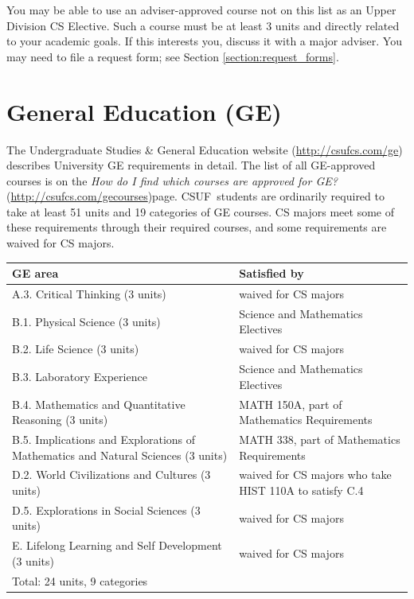 \documentclass{book}
\newcommand{\CampusName}{CSUF}
\newcommand{\shrunkurl}[1]{\url{http://csufcs.com/#1}}
\begin{document}
You may be able to use an adviser-approved course not on this list as an Upper Division CS Elective. Such a course must be at least 3 units and directly related to your academic goals. If this interests you, discuss it with a major adviser. You may need to file a request form; see Section \ref{section:request_forms}.

\section{General Education (GE)}

\newcommand{\gecourselist}{\emph{How do I find which courses are approved for GE?} (\shrunkurl{gecourses})}

The Undergraduate Studies \& General Education website (\shrunkurl{ge}) describes University GE requirements in detail. The list of all GE-approved courses is on the \gecourselist page. \CampusName~students are ordinarily required to take at least 51 units and 19 categories of GE courses. CS majors meet some of these requirements through their required courses, and some requirements are waived for CS majors.

\begin{center}
\begin{tabular}{| p{3in} | p{3in} |} \hline
  \textbf{GE area} & \textbf{Satisfied by} \\ \hline
  A.3. Critical Thinking (3 units) & waived for CS majors \\ \hline
  B.1. Physical Science (3 units) & Science and Mathematics Electives \\ \hline
  B.2. Life Science (3 units) & waived for CS majors \\ \hline
  B.3. Laboratory Experience & Science and Mathematics Electives \\ \hline
  B.4. Mathematics and Quantitative Reasoning (3 units) & MATH 150A, part of Mathematics Requirements \\ \hline
  B.5. Implications and Explorations of Mathematics and Natural Sciences (3 units) & MATH 338, part of Mathematics Requirements \\ \hline
  D.2. World Civilizations and Cultures (3 units) & waived for CS majors who take HIST 110A to satisfy C.4 \\ \hline
  D.5. Explorations in Social Sciences (3 units) & waived for CS majors \\ \hline
  E. Lifelong Learning and Self Development (3 units) & waived for CS majors \\ \hline
  \multicolumn{2}{|l|}{Total: 24 units, 9 categories} \\ \hline
\end{tabular}
\end{center}
\end{document}
